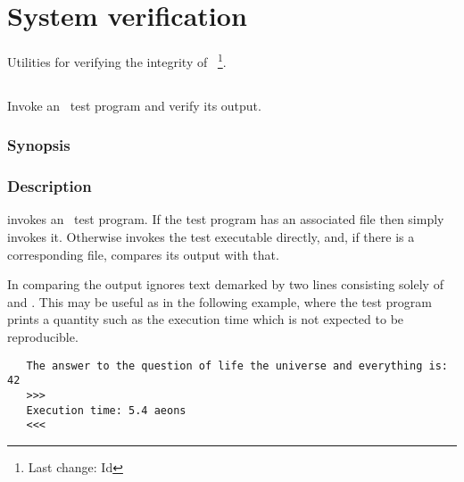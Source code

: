 \chapter{System verification}
\label{System verification}


Utilities for verifying the integrity of \aipspp\ \footnote{Last change:
$ $Id$ $}.


\section{}
\label{assay}


 
Invoke an \aipspp\ test program and verify its output.

\subsection*{Synopsis}
 
\begin{synopsis}
\end{synopsis}
 
\subsection*{Description}
 
 invokes an \aipspp\ test program.  If the test program has an
associated  file then  simply invokes it.  Otherwise
 invokes the test executable directly, and, if there is a
corresponding  file, compares its output with that.

In comparing the output  ignores text demarked by two lines
consisting solely of \code{>>>} and \code{<<<}.  This may be useful as in the
following example, where the test program prints a quantity such as the
execution time which is not expected to be reproducible.

\begin{verbatim}
   The answer to the question of life the universe and everything is: 42
   >>>
   Execution time: 5.4 aeons
   <<<
\end{verbatim}

